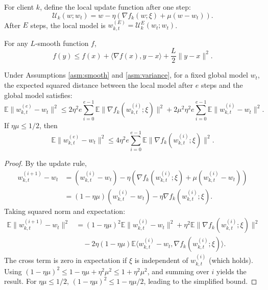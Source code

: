 \documentclass{article}
\begin{document}
\begin{definition}
    For client $k$, define the local update function after one step:
    \begin{equation}
        \mathcal{U}_k(w; w_t) = w - \eta \left( \nabla f_k(w; \xi) + \mu (w - w_t) \right).
    \end{equation}
    After $E$ steps, the local model is $w_{k,t}^{(E)} = \mathcal{U}_k^E(w_t; w_t)$.
\end{definition}

\begin{lemma} \label{lem:smooth}
    For any $L$-smooth function $f$,
    \begin{equation}
        f(y) \leq f(x) + \langle \nabla f(x), y-x \rangle + \frac{L}{2} \| y-x \|^2.
    \end{equation}
\end{lemma}

\begin{lemma} \label{lem:drift}
    Under Assumptions \ref{asm:smooth} and \ref{asm:variance}, for a fixed global model $w_t$, the expected squared distance between the local model after $e$ steps and the global model satisfies:
    \begin{equation}
        \mathbb{E} \| w_{k,t}^{(e)} - w_t \|^2 \leq 2 \eta^2 e \sum_{i=0}^{e-1} \mathbb{E} \| \nabla f_k(w_{k,t}^{(i)}; \xi) \|^2 + 2 \mu^2 \eta^2 e \sum_{i=0}^{e-1} \mathbb{E} \| w_{k,t}^{(i)} - w_t \|^2.
    \end{equation}
    If $\eta \mu \leq 1/2$, then
    \begin{equation}
        \mathbb{E} \| w_{k,t}^{(e)} - w_t \|^2 \leq 4 \eta^2 e \sum_{i=0}^{e-1} \mathbb{E} \| \nabla f_k(w_{k,t}^{(i)}; \xi) \|^2.
    \end{equation}
\end{lemma}

\begin{proof}
    By the update rule,
    \begin{align*}
        w_{k,t}^{(i+1)} - w_t &= (w_{k,t}^{(i)} - w_t) - \eta \left( \nabla f_k(w_{k,t}^{(i)}; \xi) + \mu (w_{k,t}^{(i)} - w_t) \right) \\
        &= (1 - \eta \mu)(w_{k,t}^{(i)} - w_t) - \eta \nabla f_k(w_{k,t}^{(i)}; \xi).
    \end{align*}
    Taking squared norm and expectation:
    \begin{align*}
        \mathbb{E} \| w_{k,t}^{(i+1)} - w_t \|^2 &= (1-\eta\mu)^2 \mathbb{E} \| w_{k,t}^{(i)} - w_t \|^2 + \eta^2 \mathbb{E} \| \nabla f_k(w_{k,t}^{(i)}; \xi) \|^2 \\
        &\quad - 2\eta(1-\eta\mu) \mathbb{E} \langle w_{k,t}^{(i)} - w_t, \nabla f_k(w_{k,t}^{(i)}; \xi) \rangle.
    \end{align*}
    The cross term is zero in expectation if $\xi$ is independent of $w_{k,t}^{(i)}$ (which holds). Using $(1-\eta\mu)^2 \leq 1 - \eta\mu + \eta^2\mu^2 \leq 1 + \eta^2\mu^2$, and summing over $i$ yields the result. For $\eta\mu \leq 1/2$, $(1-\eta\mu)^2 \leq 1 - \eta\mu/2$, leading to the simplified bound.
\end{proof}
\end{document}
